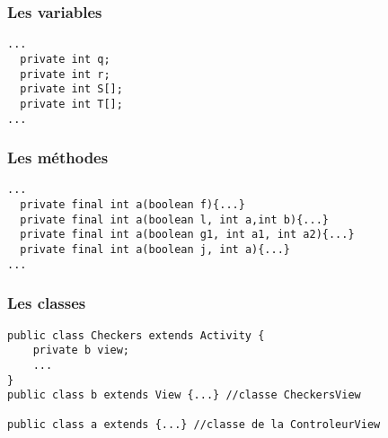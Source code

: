 \subsubsection{Les variables}
\begin{verbatim}
...
  private int q;
  private int r;
  private int S[];
  private int T[];
...
\end{verbatim}
  
\subsubsection{Les méthodes}
  \begin{verbatim}
...
  private final int a(boolean f){...}
  private final int a(boolean l, int a,int b){...} 
  private final int a(boolean g1, int a1, int a2){...}
  private final int a(boolean j, int a){...}
...
  \end{verbatim}
\newpage
\subsubsection{Les classes}
\begin{verbatim}
public class Checkers extends Activity {
	private b view;
	...  
}
public class b extends View {...} //classe CheckersView

public class a extends {...} //classe de la ControleurView
\end{verbatim}
